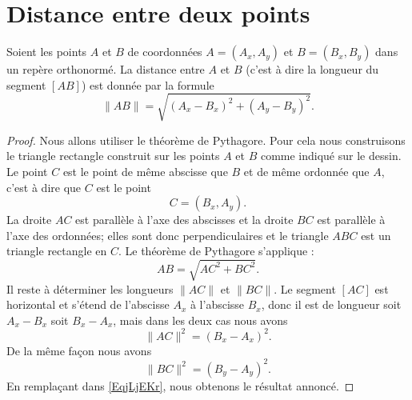\section{Distance entre deux points}

\begin{Aretenir}
\begin{multicols}{2}
        Soient les points \( A\) et \( B\) de coordonnées \( A=(A_x,A_y)\) et \( B=(B_x,B_y)\) dans un repère orthonormé. La distance entre \( A\) et \( B\) (c'est à dire la longueur du segment \( [AB]\)) est donnée par la formule
        \begin{equation}
            \| AB \|=\sqrt{(A_x-B_x)^2+(A_y-B_y)^2}.
        \end{equation}
    
\columnbreak

\phantom{a} %

\vfill



\end{multicols}
    \end{Aretenir}



\begin{proof}
    Nous allons utiliser le théorème de Pythagore. Pour cela nous construisons le triangle rectangle construit sur les points \( A\) et \( B\) comme indiqué sur le dessin. Le point \( C\) est le point de même abscisse que \( B\) et de même ordonnée que \( A\), c'est à dire que \( C\) est le point
    \begin{equation}
        C=(B_x,A_y).
    \end{equation}
    La droite \( AC\) est parallèle à l'axe des abscisses et la droite \( BC\) est parallèle à l'axe des ordonnées; elles sont donc perpendiculaires et le triangle \( ABC\) est un triangle rectangle en \( C\). Le théorème de Pythagore s'applique :
    \begin{equation}    \label{EqjLjEKr}
       AB =\sqrt{ AC^2+BC^2}.
    \end{equation}
    Il reste à déterminer les longueurs \( \| AC \|\) et \( \| BC \|\). Le segment \( [AC]\) est horizontal et s'étend de l'abscisse \( A_x\) à l'abscisse \( B_x\), donc il est de longueur soit \( A_x-B_x\) soit \( B_x-A_x\), mais dans les deux cas nous avons
    \begin{equation}
        \| AC \|^2=(B_x-A_x)^2.
    \end{equation}
    De la même façon nous avons 
    \begin{equation}
        \| BC \|^2=(B_y-A_y)^2.
    \end{equation}
    En remplaçant dans \eqref{EqjLjEKr}, nous obtenons le résultat annoncé.
\end{proof}

